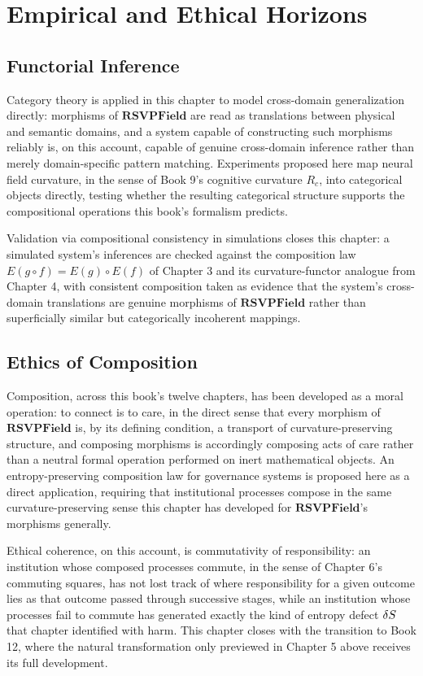 \part{Empirical and Ethical Horizons}

\chapter{Functorial Inference}

Category theory is applied in this chapter to model cross-domain generalization directly: morphisms of $\mathbf{RSVPField}$ are read as translations between physical and semantic domains, and a system capable of constructing such morphisms reliably is, on this account, capable of genuine cross-domain inference rather than merely domain-specific pattern matching. Experiments proposed here map neural field curvature, in the sense of Book 9's cognitive curvature $R_c$, into categorical objects directly, testing whether the resulting categorical structure supports the compositional operations this book's formalism predicts.

Validation via compositional consistency in simulations closes this chapter: a simulated system's inferences are checked against the composition law $E(g \circ f) = E(g) \circ E(f)$ of Chapter 3 and its curvature-functor analogue from Chapter 4, with consistent composition taken as evidence that the system's cross-domain translations are genuine morphisms of $\mathbf{RSVPField}$ rather than superficially similar but categorically incoherent mappings.

\chapter{Ethics of Composition}

Composition, across this book's twelve chapters, has been developed as a moral operation: to connect is to care, in the direct sense that every morphism of $\mathbf{RSVPField}$ is, by its defining condition, a transport of curvature-preserving structure, and composing morphisms is accordingly composing acts of care rather than a neutral formal operation performed on inert mathematical objects. An entropy-preserving composition law for governance systems is proposed here as a direct application, requiring that institutional processes compose in the same curvature-preserving sense this chapter has developed for $\mathbf{RSVPField}$'s morphisms generally.

Ethical coherence, on this account, is commutativity of responsibility: an institution whose composed processes commute, in the sense of Chapter 6's commuting squares, has not lost track of where responsibility for a given outcome lies as that outcome passed through successive stages, while an institution whose processes fail to commute has generated exactly the kind of entropy defect $\delta S$ that chapter identified with harm. This chapter closes with the transition to Book 12, where the natural transformation only previewed in Chapter 5 above receives its full development.

